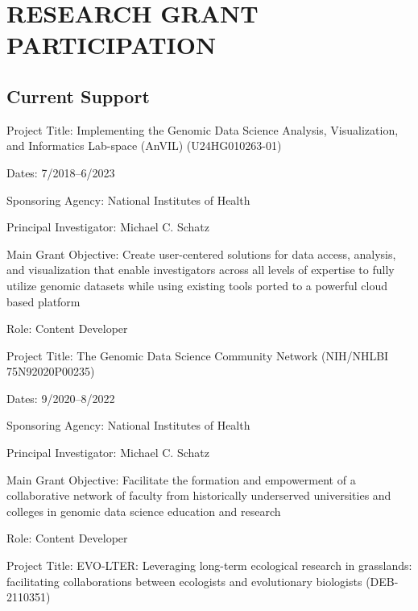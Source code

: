 \documentclass{cv}
\begin{document}


\section*{RESEARCH GRANT PARTICIPATION}

\subsection*{Current Support}

Project Title: Implementing the Genomic Data Science Analysis, Visualization, and Informatics Lab-space
(AnVIL) (U24HG010263-01)

Dates: 7/2018--6/2023

Sponsoring Agency: National Institutes of Health

Principal Investigator: Michael C. Schatz

Main Grant Objective: Create user-centered solutions for data access, analysis, and visualization that enable investigators across all levels of expertise to fully utilize genomic datasets while using existing tools ported to a powerful cloud based platform

Role: Content Developer

\vspace{5mm}

Project Title: The Genomic Data Science Community Network (NIH/NHLBI 75N92020P00235)

Dates: 9/2020--8/2022

Sponsoring Agency: National Institutes of Health

Principal Investigator: Michael C. Schatz

Main Grant Objective: Facilitate the formation and empowerment of a collaborative network of faculty from historically underserved universities and colleges in genomic data science education and research

Role: Content Developer

\vspace{5mm}

Project Title: EVO-LTER: Leveraging long-term ecological research in grasslands: facilitating collaborations between ecologists and evolutionary biologists (DEB-2110351)
\end{document}
